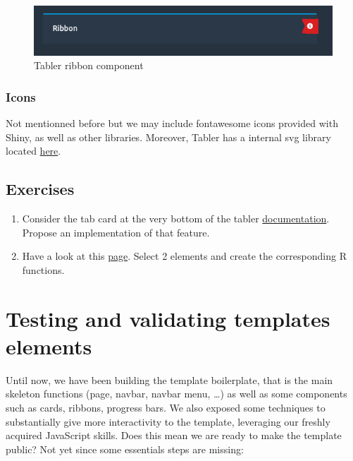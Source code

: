 \documentclass[
]{book}
\providecommand{\tightlist}{%
  \setlength{\itemsep}{0pt}\setlength{\parskip}{0pt}}
\begin{document}
\begin{figure}
\includegraphics[width=7.58in]{images/practice/tabler-ribbon} \caption{Tabler ribbon component}\label{fig:tabler-ribbon}
\end{figure}

\hypertarget{icons}{%
\subsection{Icons}\label{icons}}

Not mentionned before but we may include fontawesome icons provided with Shiny, as well as other libraries. Moreover, Tabler has a internal svg library located \href{https://preview-dev.tabler.io/icons.html}{here}.

\hypertarget{exercises}{%
\section{Exercises}\label{exercises}}

\begin{enumerate}
\def\labelenumi{\arabic{enumi}.}
\tightlist
\item
  Consider the tab card at the very bottom of the tabler \href{https://preview-dev.tabler.io/docs/cards.html}{documentation}. Propose an implementation of that feature.
\item
  Have a look at this \href{https://preview-dev.tabler.io/snippets.html}{page}. Select 2 elements and create the corresponding R functions.
\end{enumerate}

\hypertarget{custom-templates-testing}{%
\chapter{Testing and validating templates elements}\label{custom-templates-testing}}

Until now, we have been building the template boilerplate, that is the main skeleton functions (page, navbar, navbar menu, \ldots) as well as some components such as cards, ribbons, progress bars. We also exposed some techniques to substantially give more interactivity to the template, leveraging our freshly acquired JavaScript skills. Does this mean we are ready to make the template public? Not yet since some essentials steps are missing:
\end{document}
